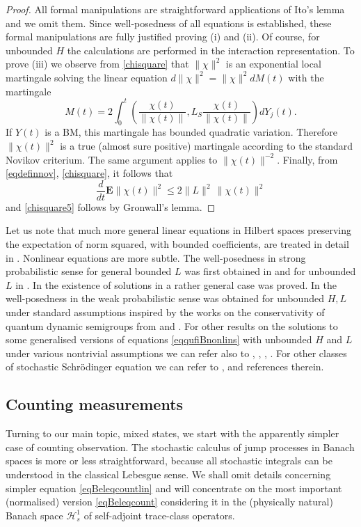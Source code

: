 \documentclass[10pt,a4paper]{amsart}
\def\HC{\mathcal{H}}
\def\E{\mathbf{E}}
\begin{document}
\begin{proof} All formal manipulations are straightforward applications of Ito's lemma and we omit them.
Since well-posedness of all equations is established, these formal manipulations are fully
justified proving (i) and (ii).
Of course, for unbounded $H$ the calculations are performed in the interaction representation.
To prove (iii) we observe from \eqref{chisquare} that $\|\chi\|^2$ is an exponential local martingale solving
the linear equation $d\|\chi\|^2=\|\chi\|^2 dM(t)$ with the martingale
\[
 M(t)=2\int_0^t \left(\frac{\chi(t)}{\|\chi (t)\|},L_S \frac{\chi(t)}{\|\chi (t)\|}\right)dY_j(t).
 \]
 If $Y(t)$ is a BM, this martingale has bounded quadratic variation. Therefore $\|\chi(t)\|^2$ is a true
 (almost sure positive) martingale according to the standard Novikov criterium.
 The same argument applies to $\|\chi(t)\|^{-2}$. Finally, from \eqref{eqdefinnov}, \eqref{chisquare}, it follows that
 \[
 \frac{d}{dt} \E \|\chi(t)\|^2 \le 2\|L\|^2 \, \|\chi(t)\|^2
 \]
 and  \eqref{chisquare5} follows by Gronwall's lemma.
\end{proof}

Let us note that much
more general linear equations in Hilbert spaces preserving the expectation of norm squared,
with bounded coefficients, are treated in detail in \cite{BarchHol}. Nonlinear equations are
more subtle. The well-posedness in strong probabilistic sense for general bounded $L$ was
first obtained in \cite{KolQuantLLN} and for unbounded $L$ in \cite{Kol25b}. In \cite{BarchHol}
 the existence of solutions in a rather general case was proved.
In \cite{MoraRebo} the well-posedness in the weak probabilistic sense was obtained
for unbounded $H,L$ under standard assumptions inspired by the works on the
conservativity of quantum dynamic semigroups from \cite{ChebFagn} and \cite{ChebQuez}.
For other results on the solutions to some generalised
versions of equations \eqref{eqqufiBnonlins} with unbounded $H$ and $L$
under various nontrivial assumptions we can refer also to  \cite{Holevo91}, \cite{Holevo96}, \cite{Fagnola},
\cite{Mora13}. For other classes  of stochastic Schr\"odinger equation we can refer to \cite{BarbRock16},
\cite{GreckGenerNonlinSchr} and references therein.

\subsection{Counting measurements}

Turning to our main topic, mixed states,
we start with the apparently simpler case of counting observation. The
stochastic calculus of jump processes in Banach spaces is more or less straightforward,
because all stochastic integrals can be understood
in the classical Lebesgue sense.
We shall omit details concerning simpler equation \eqref{eqBeleqcountlin}
and will concentrate on the most important (normalised) version \eqref{eqBeleqcount}
considering it in the (physically natural) Banach space
$\HC^1_s$ of self-adjoint trace-class operators.
\end{document}
